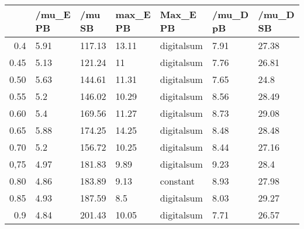 \begin{table}[ht]
\centering
\begin{tabular}{rllllll}
  \hline
 & /mu\_E PB & /mu SB & max\_E PB & Max\_E PB & /mu\_D pB & /mu\_D SB \\ 
  \hline
0.4 & 5.91 & 117.13 & 13.11 & digitalsum & 7.91 & 27.38 \\ 
  0.45 & 5.13 & 121.24 & 11 & digitalsum & 7.76 & 26.81 \\ 
  0.50 & 5.63 & 144.61 & 11.31 & digitalsum & 7.65 & 24.8 \\ 
  0.55 & 5.2 & 146.02 & 10.29 & digitalsum & 8.56 & 28.49 \\ 
  0.60 & 5.4 & 169.56 & 11.27 & digitalsum & 8.73 & 29.08 \\ 
  0.65 & 5.88 & 174.25 & 14.25 & digitalsum & 8.48 & 28.48 \\ 
  0.70 & 5.2 & 156.72 & 10.25 & digitalsum & 8.44 & 27.16 \\ 
  0,75 & 4.97 & 181.83 & 9.89 & digitalsum & 9.23 & 28.4 \\ 
  0.80 & 4.86 & 183.89 & 9.13 & constant & 8.93 & 27.98 \\ 
  0.85 & 4.93 & 187.59 & 8.5 & digitalsum & 8.03 & 29.27 \\ 
  0.9 & 4.84 & 201.43 & 10.05 & digitalsum & 7.71 & 26.57 \\ 
   \hline
\end{tabular}
\end{table}
